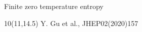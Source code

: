 \begin{frame}{Finite zero temperature entropy}

\begin{textblock}{10}(11,14.5)
\scriptsize
Y. Gu et al., JHEP02(2020)157
\end{textblock}
\end{frame}
